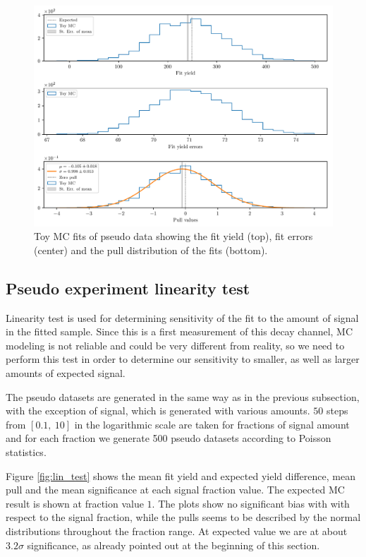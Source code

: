\begin{figure}[!htbp]
	\centering
	\captionsetup{width=0.8\linewidth}
	\includegraphics[width=\linewidth]{fig/toyMC}
	\caption{Toy MC fits of pseudo data showing the fit yield (top), fit errors (center) and the pull distribution of the fits (bottom).}
	\label{fig:toyMC}
\end{figure}

\subsection{Pseudo experiment linearity test}
Linearity test is used for determining sensitivity of the fit to the amount of signal in the fitted sample. Since this is a first measurement of this decay channel, MC modeling is not reliable and could be very different from reality, so we need to perform this test in order to determine our sensitivity to smaller, as well as larger amounts of expected signal.

The pseudo datasets are generated in the same way as in the previous subsection, with the exception of signal, which is generated with various amounts. $50$ steps from $[0.1,~10]$ in the logarithmic scale are taken for fractions of signal amount and for each fraction we generate 500 pseudo datasets according to Poisson statistics.

Figure \ref{fig:lin_test} shows the mean fit yield and expected yield difference, mean pull and the mean significance at each signal fraction value. The expected MC result is shown at fraction value $1$. The plots show no significant bias with with respect to the signal fraction, while the pulls seems to be described by the normal distributions throughout the fraction range. At expected value we are at about $3.2\sigma$ significance, as already pointed out at the beginning of this section.

